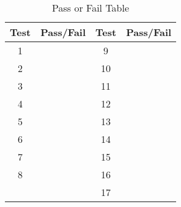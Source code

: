\begin{table}[H]
	\caption{Pass or Fail Table}
	\label{tab:label}
	\centering \fontsize{10}{10}\selectfont
	\begin{tabular}{ c | c | c | c } %
		\hline 
		Test & Pass/Fail & Test    & Pass/Fail\\
		\hline 
		1 &  & 9  &  \\
		2 &  & 10 &  \\
		3 &  & 11 &  \\
		4 &  & 12 &  \\
		5 &  & 13 &  \\
		6 &  & 14 &  \\
		7 &  & 15 &  \\
		8 &  & 16 &  \\
		&                         & 17 &  \\
		\hline
	\end{tabular}
\end{table}